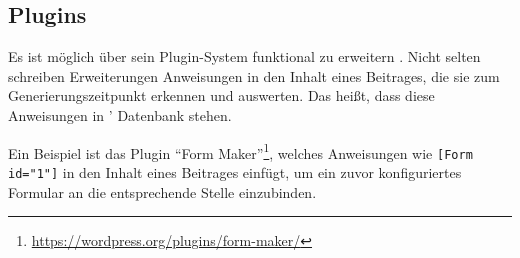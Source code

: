     \subsection{Plugins}
        \label{section:wordpressPlugins}
        Es ist möglich {\wordpress} über sein Plugin-System funktional
        zu erweitern \cite{wordpress:Plugins}.
        Nicht selten schreiben Erweiterungen Anweisungen in den Inhalt
        eines Beitrages, die sie zum Generierungszeitpunkt erkennen und auswerten.
        Das heißt, dass diese Anweisungen in {\wordpress'} Datenbank stehen.

        Ein Beispiel ist das Plugin
        "`Form Maker"'\footnote{\url{https://wordpress.org/plugins/form-maker/}},
        welches Anweisungen wie \texttt{[Form id="1"]} in den Inhalt eines Beitrages
        einfügt, um ein zuvor konfiguriertes Formular an die entsprechende Stelle einzubinden.